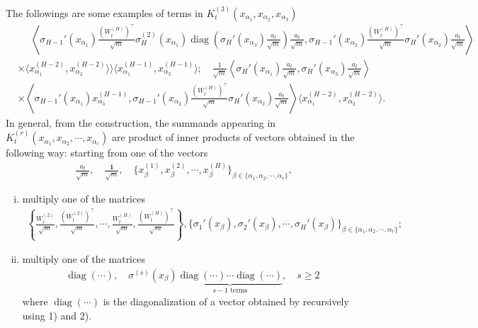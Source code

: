 \documentclass{article}
\numberwithin{equation}{section}
\newcommand{\al}{\alpha}
\DeclareMathOperator{\diag}{diag}
\renewcommand{\geq}{\geqslant}
\newcommand{\1}{\mathds{1}}
\theoremstyle{plain} %
\begin{document}
The followings are some examples of terms in $K^{(3)}_t(x_{\al_1}, x_{\al_2}, x_{\al_3})$ 
\begin{align*}
&\phantom{{}={}}\left\langle 
\sigma_{H-1}'(x_{\al_1})\frac{(W_t^{(H)})^\top}{\sqrt m} \sigma_{H}^{(2)}(x_{\al_1})\diag\left(\sigma_H'(x_{\al_3})\frac{a_t}{\sqrt m}\right)\frac{a_t}{\sqrt m},
\sigma_{H-1}'(x_{\al_2})\frac{(W_t^{(H)})^\top}{\sqrt m} \sigma_{H}'(x_{\al_2})\frac{a_t}{\sqrt m}
\right\rangle\\
&\times\langle x_{\al_1}^{(H-2)}, x_{\al_2}^{(H-2)}\rangle
\rangle\langle x_{\al_1}^{(H-1)}, x_{{\al_3}}^{(H-1)}\rangle;
\quad
\frac{1}{\sqrt m}\left\langle \sigma_H'(x_{\al_1})\frac{a_t}{\sqrt m}, \sigma_H'(x_{\al_3})\frac{a_t}{\sqrt m}\right\rangle\\
%
&\times\left\langle 
\sigma_{H-1}'(x_{\al_1})x_{{\al_3}}^{(H-1)},
\sigma_{H-1}'(x_{\al_2})\frac{(W_t^{(H)})^\top}{\sqrt m} \sigma_{H}'(x_{\al_2})\frac{a_t}{\sqrt m}
\right\rangle
 \langle x^{(H-2)}_{\al_1},x^{(H-2)}_{\al_2}\rangle.
\end{align*}
In general, from the construction, the summands appearing in $K_t^{(r)}(x_{\al_1}, x_{\al_2}, \cdots, x_{\al_r})$ are product of inner products of vectors obtained in the following way: starting from one of the vectors
\begin{align}\label{e:initterm}
\frac{a_t}{\sqrt m},\quad \frac{\bm 1}{\sqrt m}, \quad\{x^{(1)}_\beta,  x^{(2)}_\beta, \cdots, x^{(H)}_\beta\}_{\beta\in\{\al_1,\al_2,\cdots,\al_r\}},
\end{align}
\begin{enumerate}[(i)]
\item multiply one of the matrices 
\begin{align}\label{e:mult1}
\left\{\frac{W_t^{(2)}}{\sqrt m},\frac{(W_t^{(2)})^\top}{\sqrt m},\cdots, \frac{W_t^{(H)}}{\sqrt m},\frac{(W_t^{(H)})^\top}{\sqrt m}\right\},
\{\sigma_1'(x_\beta), \sigma_2'(x_\beta), \cdots, \sigma_H'(x_\beta)\}_{\beta\in\{\al_1,\al_2,\cdots,\al_r\}};
\end{align}
\item multiply one of the matrices
\begin{align}\label{e:mult2}
 \diag(\cdots),\quad \sigma^{(s)}(x_\beta)\underbrace{\diag(\cdots)\cdots\diag(\cdots)}_{s-1\text{ terms}},\quad s\geq 2
\end{align}
where $\diag(\cdots)$ is the diagonalization of a vector obtained by recursively using 1) and 2).
\end{enumerate}
\end{document}
